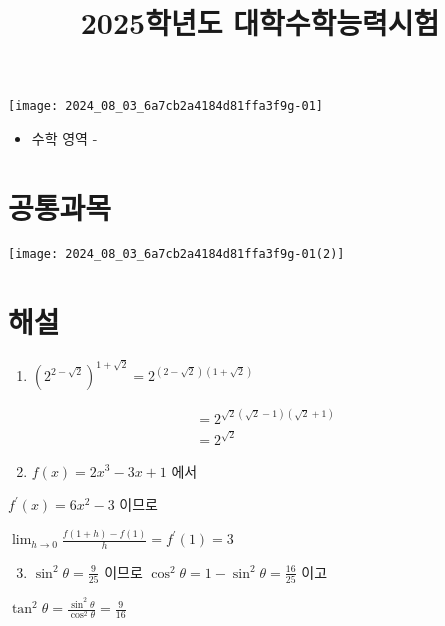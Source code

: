 \documentclass[10pt]{article}
\title{2025학년도 대학수학능력시험 }
\author{}
\date{}
\begin{document}
\maketitle
\begin{center}
\texttt{[image: 2024\_08\_03\_6a7cb2a4184d81ffa3f9g-01]}
\end{center}

\begin{itemize}
  \item 수학 영역 -
\end{itemize}

\section*{공통과목}
\begin{center}
\texttt{[image: 2024\_08\_03\_6a7cb2a4184d81ffa3f9g-01(2)]}
\end{center}

\section*{해설}
\begin{enumerate}
  \item \(\left(2^{2-\sqrt{2}}\right)^{1+\sqrt{2}}=2^{(2-\sqrt{2})(1+\sqrt{2})}\)
\end{enumerate}

\[
\begin{aligned}
& =2^{\sqrt{2}(\sqrt{2}-1)(\sqrt{2}+1)} \\
& =2^{\sqrt{2}}
\end{aligned}
\]

\begin{enumerate}
  \setcounter{enumi}{1}
  \item \(f(x)=2 x^{3}-3 x+1\) 에서
\end{enumerate}

\(f^{\prime}(x)=6 x^{2}-3\) 이므로

\(\lim _{h \rightarrow 0} \frac{f(1+h)-f(1)}{h}=f^{\prime}(1)=3\)

\begin{enumerate}
  \setcounter{enumi}{2}
  \item \(\sin ^{2} \theta=\frac{9}{25}\) 이므로 \(\cos ^{2} \theta=1-\sin ^{2} \theta=\frac{16}{25}\) 이고
\end{enumerate}

\(\tan ^{2} \theta=\frac{\sin ^{2} \theta}{\cos ^{2} \theta}=\frac{9}{16}\)
\end{document}
